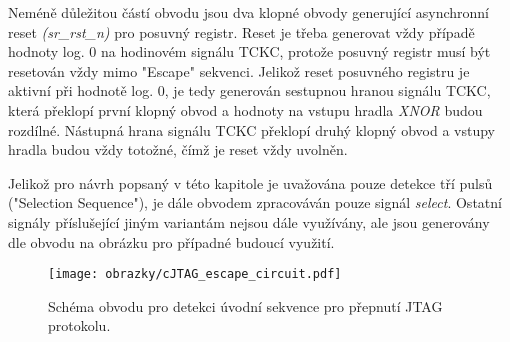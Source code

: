 Neméně důležitou částí obvodu jsou dva klopné obvody generující asynchronní reset \textit{(sr\_rst\_n)} pro posuvný registr. Reset je třeba generovat vždy případě hodnoty log. 0 na hodinovém signálu TCKC, protože posuvný registr musí být resetován vždy mimo "Escape" sekvenci. Jelikož reset posuvného registru je aktivní při hodnotě log. 0, je tedy generován sestupnou hranou signálu TCKC, která překlopí první klopný obvod a hodnoty na vstupu hradla \textit{XNOR} budou rozdílné. Nástupná hrana signálu TCKC překlopí druhý klopný obvod a vstupy hradla budou vždy totožné, čímž je reset vždy uvolněn.

Jelikož pro návrh popsaný v této kapitole je uvažována pouze detekce tří pulsů ("Selection Sequence"), je dále obvodem zpracováván pouze signál \textit{select}. Ostatní signály příslušející jiným variantám nejsou dále využívány, ale jsou generovány dle obvodu na obrázku pro případné budoucí využití.


\begin{figure}[!h]
  \begin{center}
    \texttt{[image: obrazky/cJTAG\_escape\_circuit.pdf]}
  \end{center}
  \caption{Schéma obvodu pro detekci úvodní sekvence pro přepnutí JTAG protokolu.}
	\label{fig:cJTAG_escape_circuit}
\end{figure}